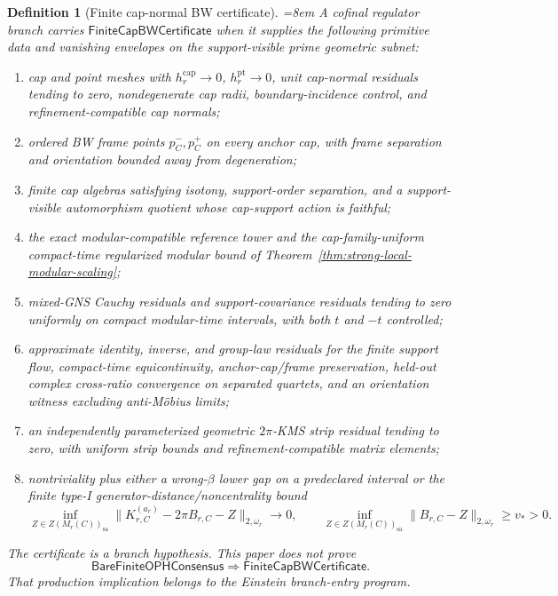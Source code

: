 \documentclass[11pt]{article}
\newtheorem{definition}[theorem]{Definition}
\begin{document}
\begin{definition}[Finite cap-normal BW certificate]\label{def:finite-cap-bw-certificate}\emergencystretch=8em\relax
A cofinal regulator branch carries \(\mathsf{FiniteCapBWCertificate}\) when it supplies the
following primitive data and vanishing envelopes on the support-visible prime geometric subnet:
\begin{enumerate}[label=\textup{C\arabic*.},leftmargin=2.4em]
\item cap and point meshes with \(h_r^{\mathrm{cap}}\to0\), \(h_r^{\mathrm{pt}}\to0\), unit
cap-normal residuals tending to zero, nondegenerate cap radii, boundary-incidence control, and
refinement-compatible cap normals;
\item ordered BW frame points \(p_C^-,p_C^+\) on every anchor cap, with frame separation and
orientation bounded away from degeneration;
\item finite cap algebras satisfying isotony, support-order separation, and a support-visible
automorphism quotient whose cap-support action is faithful;
\item the exact modular-compatible reference tower and the cap-family-uniform compact-time
regularized modular bound of Theorem~\ref{thm:strong-local-modular-scaling};
\item mixed-GNS Cauchy residuals and support-covariance residuals tending to zero uniformly on
compact modular-time intervals, with both \(t\) and \(-t\) controlled;
\item approximate identity, inverse, and group-law residuals for the finite support flow,
compact-time equicontinuity, anchor-cap/frame preservation, held-out complex cross-ratio
convergence on separated quartets, and an orientation witness excluding anti-M\"obius limits;
\item an independently parameterized geometric \(2\pi\)-KMS strip residual tending to zero, with
uniform strip bounds and refinement-compatible matrix elements;
\item nontriviality plus either a wrong-\(\beta\) lower gap on a predeclared interval or the
finite type-I generator-distance/noncentrality bound
\[
\inf_{Z\in Z(M_r(C))_{\mathrm{sa}}}
\|K_{r,C}^{(a_r)}-2\pi B_{r,C}-Z\|_{2,\omega_r}\to0,
\qquad
\inf_{Z\in Z(M_r(C))_{\mathrm{sa}}}\|B_{r,C}-Z\|_{2,\omega_r}\ge v_\ast>0 .
\]
\end{enumerate}
The certificate is a branch hypothesis. This paper does not prove
\[
\mathsf{BareFiniteOPHConsensus}\Longrightarrow \mathsf{FiniteCapBWCertificate}.
\]
That production implication belongs to the Einstein branch-entry program.
\end{definition}
\end{document}
